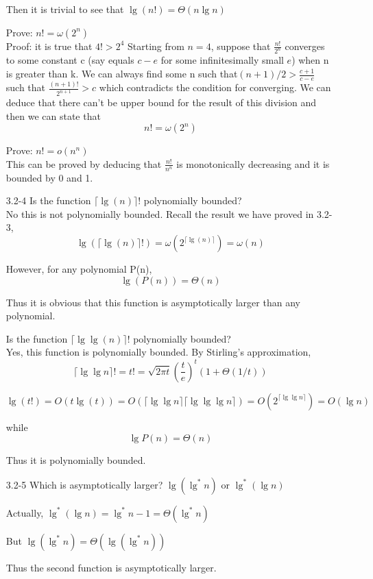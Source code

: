 \documentclass[]{article}
\begin{document}
\begin{enumerate}
Then it is trivial to see that $ \lg(n!) = \Theta(n\lg n) $

Prove: $ n! = \omega(2^n) $\\
Proof: it is true that $ 4! > 2^4 $
Starting from $n=4$, suppose that $ \frac{n!}{2^n} $ converges to some constant c (say equals $ c-e $ for some infinitesimally small $ e $) when n is greater than k. We can always find some n such that$(n+1)/2 > \frac{c+1}{c-e}$ such that $\frac{(n+1)!}{2^{n+1}} > c$ which contradicts the condition for converging. We can deduce that there can't be upper bound for the result of this division and then we can state that 
$$
n! = \omega(2^n)
$$

Prove: $ n! = o(n^n) $\\
This can be proved by deducing that $\frac{n!}{n^n}$ is monotonically decreasing and it is bounded by 0 and 1.

\item[3.2-4] Is the function $ \lceil \lg(n) \rceil ! $ polynomially bounded?\\
No this is not polynomially bounded. Recall the result we have proved in 3.2-3, $$ \lg( \lceil \lg(n) \rceil ! ) = \omega( 2^{\lceil \lg(n) \rceil} ) = \omega (n) $$

However, for any polynomial P(n), $$ \lg(P(n)) = \Theta(n) $$

Thus it is obvious that this function is asymptotically larger than any polynomial.

Is the function $ \lceil \lg \lg(n) \rceil ! $ polynomially bounded?\\

Yes, this function is polynomially bounded. By Stirling's approximation, 
$$
\lceil\lg\lg n\rceil! = t! = \sqrt{2\pi t}(\frac{t}{e})^{t}(1+\Theta(1/t))
$$

$$ \lg (t!) = O(t \lg (t) ) = O(\lceil\lg\lg n\rceil \lceil\lg\lg\lg n\rceil) = O(2^{\lceil\lg\lg n\rceil}) = O(\lg n)$$

while $$ \lg P(n) = \Theta(n)  $$

Thus it is polynomially bounded.

\item[3.2-5] Which is asymptotically larger? $ \lg(\lg^* n) $ or $ \lg^*(\lg n) $

Actually, $ \lg^*(\lg n) = \lg^* n -1 = \Theta(\lg^* n)$

But $ \lg(\lg^* n) = \Theta(\lg(\lg^* n)) $

Thus the second function is asymptotically larger.


\end{enumerate}
\end{document}
